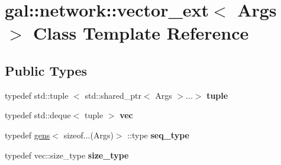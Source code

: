 \hypertarget{classgal_1_1network_1_1vector__ext}{\section{gal\-:\-:network\-:\-:vector\-\_\-ext$<$ \-Args $>$ \-Class \-Template \-Reference}
\label{classgal_1_1network_1_1vector__ext}
}
\subsection*{\-Public \-Types}
\begin{DoxyCompactItemize}
\item 
\hypertarget{classgal_1_1network_1_1vector__ext_a43f948bb7b6e59852f6412a54c161287}{typedef std\-::tuple\*
$<$ std\-::shared\-\_\-ptr$<$ \-Args $>$...$>$ {\bfseries tuple}}\label{classgal_1_1network_1_1vector__ext_a43f948bb7b6e59852f6412a54c161287}

\item 
\hypertarget{classgal_1_1network_1_1vector__ext_a1954fce41858f6273a6718940547a337}{typedef std\-::deque$<$ tuple $>$ {\bfseries vec}}\label{classgal_1_1network_1_1vector__ext_a1954fce41858f6273a6718940547a337}

\item 
\hypertarget{classgal_1_1network_1_1vector__ext_a69bfb7e937959532d332fc8e88e03573}{typedef \hyperlink{structgens}{gens}$<$ sizeof...(\-Args)$>$\*
\-::type {\bfseries seq\-\_\-type}}\label{classgal_1_1network_1_1vector__ext_a69bfb7e937959532d332fc8e88e03573}

\item 
\hypertarget{classgal_1_1network_1_1vector__ext_ac7c4f1bf0d33c52667c1cf6afefa9f3c}{typedef vec\-::size\-\_\-type {\bfseries size\-\_\-type}}\label{classgal_1_1network_1_1vector__ext_ac7c4f1bf0d33c52667c1cf6afefa9f3c}

\end{DoxyCompactItemize}
